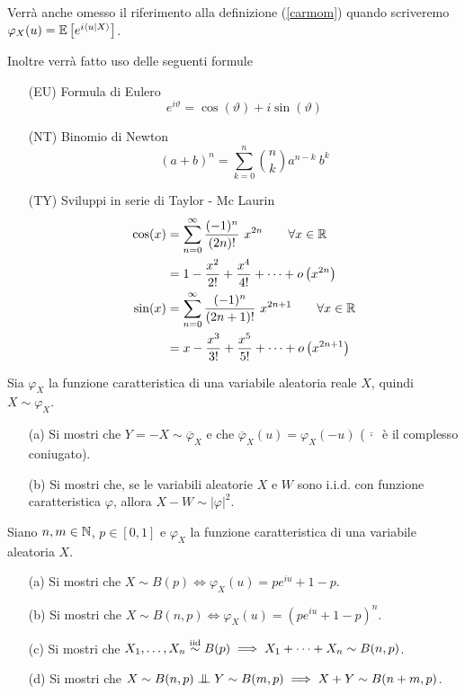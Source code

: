 Verrà anche omesso il riferimento alla definizione (\ref{carmom}) quando scriveremo $\varphi_X(u)=\mathbb{E}\left[e^{i \langle u|X\rangle}\right]$.

Inoltre verrà fatto uso delle seguenti formule
\begin{enumerate}
\item [(EU)] Formula di Eulero
\[
e^{i \vartheta}=\cos(\vartheta) + i \sin (\vartheta)
\]
\item [(NT)] Binomio di Newton
\[
(a+b)^n=\sum_{k=0}^n\binom{n}{k}a^{n-k}\ b^k
\]
\item [(TY)] Sviluppi in serie di Taylor - Mc Laurin
\begin{gather*}
\begin{aligned}
\cos(x)&=\sum_{n=0}^\infty\frac{(-1)^n}{(2n)!}\ x^{2n}\qquad\forall x\in\RR \\
&=1-\frac{x^2}{2!}+\frac{x^4}{4!}+\cdots +o\left(x^{2n}\right)\\
\sin(x)&=\sum_{n=0}^\infty\frac{(-1)^n}{(2n+1)!}\ x^{2n+1}\qquad\forall x\in\RR\\
&=x-\frac{x^3}{3!}+\frac{x^5}{5!}+\cdots+o\left(x^{2n+1}\right)
\end{aligned}
\end{gather*}
\end{enumerate}

\newpage

%

\ParteEsercizi

\Esercizio{} %
Sia $\varphi_X$ la funzione caratteristica di una variabile aleatoria reale $X$, quindi $X\sim\varphi_X$.
\begin{enumerate}
\item [(a)] Si mostri che $Y=-X\sim\overline{\varphi}_X$ e che $\overline{\varphi}_X(u)=\varphi_X(-u)$ ($\overline{\ \cdot\ }$ è il complesso coniugato).
\item [(b)] Si mostri che, se le variabili aleatorie $X$ e $W$ sono i.i.d. con funzione caratteristica $\varphi$, allora $X-W\sim|\varphi|^2$.
\end{enumerate}

\Esercizio{} %
Siano $ n,m \in \mathbb{N}$, $p\in [0, 1]$ e $\varphi_X$ la funzione caratteristica di una variabile aleatoria $X$.
\begin{enumerate}
\item [(a)] Si mostri che $X\sim B(p)\iff\varphi_X(u)=pe^{iu}+1-p$.
\item [(b)] Si mostri che $X\sim B(n,p)\iff\varphi_X(u)=\left(pe^{iu}+1-p  \right)^n$.
\item [(c)] Si mostri che $X_1,\dots,X_n\stackrel{\mathrm{iid}}{\sim} B(p)\implies X_1+\cdots+X_n\sim B(n,p)$.
\item [(d)] Si mostri che $X\sim B(n,p)\indep Y\sim B(m,p)\implies X+Y\sim B(n+m,p)$.
\end{enumerate}

